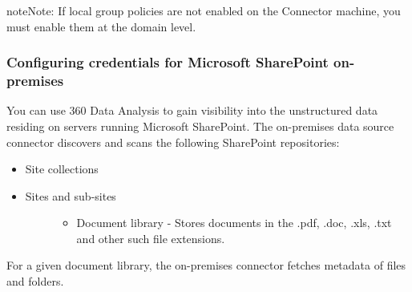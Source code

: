 \documentclass[letterpaper,10pt,english]{sphinxmanual}
\begin{document}
\begin{sphinxadmonition}{note}{Note:}
If local group policies are not enabled on the Connector machine, you must enable them at the domain level.
\end{sphinxadmonition}


\subsubsection{Configuring credentials for Microsoft SharePoint on-premises}
\label{\detokenize{mcdmp_app_ug:configuring-credentials-for-microsoft-sharepoint-on-premises}}
You can use 360 Data Analysis to gain visibility into the unstructured data residing on servers running Microsoft SharePoint. The on-premises data source connector discovers and scans the following SharePoint repositories:
\begin{itemize}
\item {} 
Site collections

\item {} \begin{description}
\item[{Sites and sub-sites}] \leavevmode\begin{itemize}
\item {} 
Document library - Stores documents in the .pdf, .doc, .xls, .txt and other such
file extensions.

\end{itemize}

\end{description}

\end{itemize}

For a given document library, the on-premises connector fetches metadata of files and folders.
\end{document}
